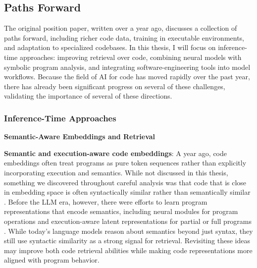 \subsection{Paths Forward} \label{sec:paths}

The original position paper, written over a year ago, discusses a collection of paths forward, including richer code data, training in executable 
environments, and adaptation to specialized codebases. In this thesis, I will focus on inference-time 
approaches: improving retrieval over code, combining neural models with symbolic program analysis, 
and integrating software-engineering tools into model workflows.
Because the field of AI for code has moved rapidly over the past year, there has already 
been significant progress on several of these challenges, validating the importance of several of
these directions.

\subsubsection{Inference-Time Approaches}

\par\medskip\noindent\textbf{Semantic-Aware Embeddings and Retrieval}\label{sec:directions-retrieval}\par\smallskip

\textbf{Semantic and execution-aware code embeddings}: A year ago, code embeddings often treat programs as 
pure token sequences rather than explicitly incorporating execution and semantics. 
While not discussed in this thesis, something we discovered throughout careful analysis was that
code that is close in embedding space is often syntactically similar rather than semantically similar \citep{utpala2023language}. 
Before the LLM era, however, there were efforts to learn program representations that encode semantics, 
including neural modules for program operations \citep{nye2020representing} and 
execution-aware latent representations for partial or full programs \citep{zohar2018automatic, ellis2019write, chen2021latent}. 
While today's language models reason about semantics beyond just syntax, they still use syntactic similarity as a strong
signal for retrieval.  
Revisiting these ideas may improve both code retrieval abilities while making code 
representations more aligned with program behavior.

